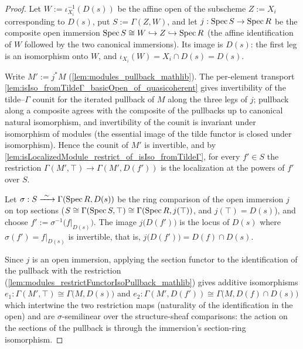 \begin{proof}
  \leanok
  Let \(W := \iota_{X_i}^{-1}(D(s))\) be the affine open of the subscheme \(Z := X_i\)
  corresponding to \(D(s)\), put \(S := \Gamma(Z, W)\), and let
  \(j : \operatorname{Spec} S \to \operatorname{Spec} R\) be the composite open immersion
  \(\operatorname{Spec} S \cong W \hookrightarrow Z \hookrightarrow \operatorname{Spec} R\) (the affine
  identification of \(W\) followed by the two canonical immersions). Its image is
  \(D(s)\): the first leg is an isomorphism onto \(W\), and
  \(\iota_{X_i}(W) = X_i \cap D(s) = D(s)\).

  Write \(M' := j^{*} M\) (\cref{lem:modules_pullback_mathlib}). The per-element
  transport \cref{lem:isIso_fromTildeΓ_basicOpen_of_quasicoherent} gives invertibility of
  the tilde--\(\Gamma\) counit for the iterated pullback of \(M\) along the three legs of
  \(j\); pullback along a composite agrees with the composite of the pullbacks up to
  canonical natural isomorphism, and invertibility of the counit is invariant under
  isomorphism of modules (the essential image of the tilde functor is closed under
  isomorphism). Hence the counit of \(M'\) is invertible, and by
  \cref{lem:isLocalizedModule_restrict_of_isIso_fromTildeΓ}, for every \(f' \in S\) the
  restriction \(\Gamma(M', \top) \to \Gamma(M', D(f'))\) is the localization at the
  powers of \(f'\) over \(S\).

  Let \(\sigma : S \xrightarrow{\ \sim\ } \Gamma(\operatorname{Spec} R, D(s))\) be the ring comparison
  of the open immersion \(j\) on top sections
  (\(S \cong \Gamma(\operatorname{Spec} S, \top) \cong \Gamma(\operatorname{Spec} R, j(\top))\), and
  \(j(\top) = D(s)\)), and choose \(f' := \sigma^{-1}\bigl(f|_{D(s)}\bigr)\). The image
  \(j\bigl(D(f')\bigr)\) is the locus of \(D(s)\) where \(\sigma(f') = f|_{D(s)}\) is
  invertible, that is, \(j\bigl(D(f')\bigr) = D(f) \cap D(s)\).

  Since \(j\) is an open immersion, applying the section functor to the identification of
  the pullback with the restriction (\cref{lem:modules_restrictFunctorIsoPullback_mathlib})
  gives additive isomorphisms
  \(e_1 : \Gamma(M', \top) \cong \Gamma\bigl(M, D(s)\bigr)\) and
  \(e_2 : \Gamma(M', D(f')) \cong \Gamma\bigl(M, D(f) \cap D(s)\bigr)\) which intertwine
  the two restriction maps (naturality of the identification in the open) and are
  \(\sigma\)-semilinear over the structure-sheaf comparisons: the action on the sections
  of the pullback is through the immersion's section-ring isomorphism.


\end{proof}
